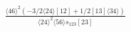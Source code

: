 \documentclass[varwidth, border=5pt]{standalone}
\begin{document}
\begin{my}
$\begin{gathered}
\scriptscriptstyle\frac{⟨46⟩^2\scriptscriptstyle(-3/2⟨24⟩[12]+1/2[13]⟨34⟩)}{⟨24⟩^2⟨56⟩s_{123}[23]}
\end{gathered}$
\end{my}
\end{document}
